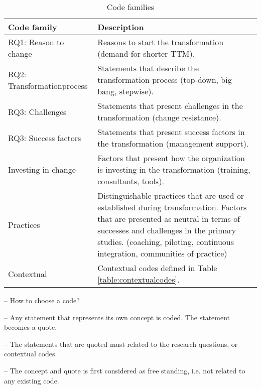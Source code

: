 \documentclass[preprint,authoryear,12pt]{elsarticle}
\begin{document}
\begin{table}[h]
    \begin{tabular}{ p{} p{} }
        \toprule
        Code family          &  Description
        \\
        \midrule

        RQ1: Reason to change &
        Reasons to start the transformation (demand for shorter
        TTM\footnotemark[1]). \\

		RQ2: Transformation\newline process &
		Statements that describe the transformation process (top-down, big bang,
		stepwise). \\

		RQ3: Challenges &
		Statements that present challenges in the transformation (change resistance).
		\\

		RQ3: Success factors &
		Statements that present success factors in the transformation (management
		support).
		\\

		Investing in change  &
		Factors that present how the organization is investing in the
		transformation (training, consultants, tools). \\

		Practices &
		Distinguishable practices that are used or established during transformation.
		Factors that are presented as neutral in terms of successes and challenges
		in the primary studies.
		(coaching, piloting, continuous integration, communities of practice) \\
		
		Contextual &
		Contextual codes defined in Table \ref{table:contextualcodes}. \\
		
        \bottomrule
    \end{tabular}
    \caption{Code families}
    \label{table:codefamilies}
\end{table}



-- How to choose a code?

-- Any statement that represents its own concept is coded. The statement becomes
   a quote.

-- The statements that are quoted must related to the research questions, or
   contextual codes.

-- The concept and quote is first considered as free standing, i.e. not
   related to any existing code.
\end{document}
